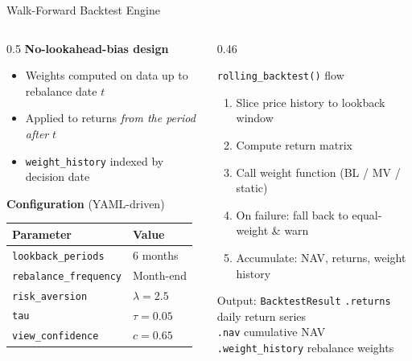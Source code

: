 \documentclass[aspectratio=169, 10pt]{beamer}
\begin{document}
\begin{frame}{Walk-Forward Backtest Engine}

  \begin{columns}[T]
    \begin{column}{0.5\textwidth}
      \textbf{No-lookahead-bias design}
      \begin{itemize}
        \item Weights computed on data up to rebalance date $t$
        \item Applied to returns \emph{from the period after} $t$
        \item \texttt{weight\_history} indexed by decision date
      \end{itemize}

      \bigskip
      \textbf{Configuration} (YAML-driven)
      \medskip

      \begin{tabular}{@{}ll@{}}
        \toprule
        Parameter & Value \\
        \midrule
        \texttt{lookback\_periods}   & 6 months \\
        \texttt{rebalance\_frequency}& Month-end \\
        \texttt{risk\_aversion}      & $\lambda = 2.5$ \\
        \texttt{tau}                 & $\tau = 0.05$ \\
        \texttt{view\_confidence}    & $c = 0.65$ \\
        \bottomrule
      \end{tabular}
    \end{column}

    \begin{column}{0.46\textwidth}
      \begin{block}{\texttt{rolling\_backtest()} flow}
        \small
        \begin{enumerate}
          \item Slice price history to lookback window
          \item Compute return matrix
          \item Call weight function (BL / MV / static)
          \item On failure: fall back to equal-weight \& warn
          \item Accumulate: NAV, returns, weight history
        \end{enumerate}
      \end{block}

      \bigskip
      \begin{block}{Output: \texttt{BacktestResult}}
        \small
        \texttt{.returns} \quad daily return series\\
        \texttt{.nav} \quad \phantom{dai}cumulative NAV\\
        \texttt{.weight\_history} \quad rebalance weights
      \end{block}
    \end{column}
  \end{columns}
\end{frame}
\end{document}
